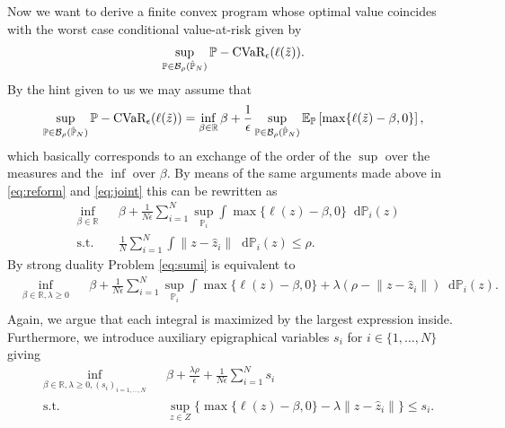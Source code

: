 \documentclass{scrartcl}
\newcommand*\diff{\mathop{}\!\mathrm{d}}
\renewcommand{\P}{\mathbb{P}}
\newcommand{\E}{\mathbb{E}}
\newcommand{\R}{\mathbb{R}}
\newcommand{\ball}{\mathcal{B}}
\newcommand{\cvar}{\textup{CVaR}}
\begin{document}
Now we want to derive a finite convex program whose optimal value coincides with
the worst case conditional value-at-risk given by
\begin{equation}
  \label{eq:op_two}
  \begin{aligned}
    \sup_{\P \in \ball_{\rho}(\hat{\P}_{N})} \P-\cvar_{\epsilon}( \ell(\tilde{z}) ). 
  \end{aligned}
\end{equation}
By the hint given to us we may assume that
\begin{equation}
  \label{eq:op_hint}
  \begin{aligned}
    \sup_{\P \in \ball_{\rho}(\hat{\P}_{N})} \P-\cvar_{\epsilon}( \ell(\tilde{z}) ) =
    \inf_{\beta \in \R} \beta + \frac{1}{\epsilon} \sup_{\P \in \ball_{\rho}(\hat{\P}_{N})} \E_{\P} \left[ \max\{ \ell (\tilde{z}) - \beta, 0 \} \right],
  \end{aligned}
\end{equation}
which basically corresponds to an exchange of the order of the $\sup$ over the
measures and the $\inf$ over $\beta$.
By means of the same arguments made above in \eqref{eq:reform} and
\eqref{eq:joint} this can be rewritten as
\begin{equation}
  \label{eq:sumi}
  \begin{aligned}
  & \inf_{\beta \in \R} & & \beta + \frac{1}{N\epsilon} \sum_{i=1}^N \sup_{\P_i} \int \max\{ \ell (z) - \beta, 0 \} \diff \P_i(z) \\
  & \text{s.t.} & & \frac{1}{N} \sum_{i=1}^N \int \lVert z-\hat{z}_i  \rVert \diff \P_i(z) \le \rho.
  \end{aligned}
\end{equation}
By strong duality Problem \eqref{eq:sumi} is equivalent to
\begin{equation}
  \label{eq:duality}
  \begin{aligned}
  & \inf_{\beta \in \R, \lambda\geq0} & & \beta + \frac{1}{N\epsilon} \sum_{i=1}^N \sup_{\P_i} \int \max\{ \ell (z) - \beta, 0 \} + \lambda (\rho - \lVert z-\hat{z}_i  \rVert) \diff \P_i(z). \\
  \end{aligned}
\end{equation}
Again, we argue that each integral is maximized by the largest expression
inside. Furthermore, we introduce auxiliary epigraphical variables $s_i$ for $i
\in \{1,\dots,N\}$ giving
\begin{equation}
  \label{eq:sup}
  \begin{aligned}
    & \inf_{\beta \in \R, \lambda\geq0, (s_i)_{i=1,\dots,N}} & & \beta + \frac{\lambda\rho}{\epsilon} + \frac{1}{N\epsilon} \sum_{i=1}^N s_i \\
    & \text{s.t.} & & \sup_{z \in Z}\{ \max\{ \ell (z) - \beta, 0 \} - \lambda \lVert z-\hat{z}_i  \rVert \} \le s_i.
  \end{aligned}
\end{equation}
\end{document}
